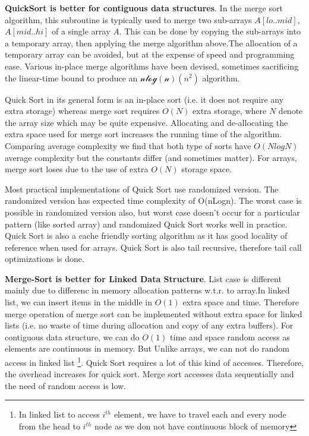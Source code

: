 \textbf{QuickSort is better for contiguous data structures}.
In the merge sort algorithm, this subroutine is typically used to merge two sub-arrays $A[lo..mid]$, $A[mid..hi]$ of a single array $A$. This can be done by copying the sub-arrays into a temporary array, then applying the merge algorithm above.The allocation of a temporary array can be avoided, but at the expense of speed and programming ease. Various in-place merge algorithms have been devised, sometimes sacrificing the linear-time bound to produce an $\mathcal{nlog(n)}(n^2)$ algorithm.

Quick Sort in its general form is an in-place sort (i.e. it does not require any extra storage) whereas merge sort requires $O(N)$ extra storage, where $N$ denote the array size which may be quite expensive. Allocating and de-allocating the extra space used for merge sort increases the running time of the algorithm. Comparing average complexity we find that both type of sorts have $O(NlogN)$ average complexity but the constants differ (and sometimes matter). For arrays, merge sort loses due to the use of extra $O(N)$ storage space.

Most practical implementations of Quick Sort use randomized version. The randomized version has expected time complexity of O(nLogn). The worst case is possible in randomized version also, but worst case doesn’t occur for a particular pattern (like sorted array) and randomized Quick Sort works well in practice.
Quick Sort is also a cache friendly sorting algorithm as it has good locality of reference when used for arrays.
Quick Sort is also tail recursive, therefore tail call optimizations is done.

\textbf{Merge-Sort is better for Linked Data Structure}.
List case is different mainly due to differenc in memory allocation patterns w.t.r. to array.In linked list, we can insert items in the middle in $O(1)$ extra space and time. Therefore merge operation of merge sort can be implemented without extra space for linked lists (i.e. no waste of time during allocation and copy of any extra buffers). 
For contiguous data structure, we can do $O(1)$ time and space random access as elements are continuous in memory. But  Unlike arrays, we can not do random access in linked list \footnote{In linked list to access $i^{th}$ element, we have to travel each and every node from the head to $i^{th}$ node as we don not have continuous block of memory}. Quick Sort requires a lot of this kind of accesses. Therefore, the overhead increases for quick sort. Merge sort accesses data sequentially and the need of random access is low.


